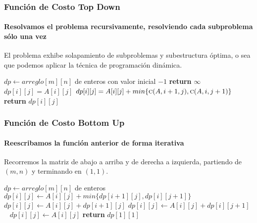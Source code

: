\documentclass[spanish]{beamer}
\begin{document}
    \begin{frame}
        \frametitle{Función de Costo Top Down}
        \framesubtitle{Resolvamos el problema recursivamente, resolviendo cada subproblema sólo una vez}

        El problema exhibe solapamiento de subproblemas y subestructura óptima, o sea que podemos aplicar la técnica de programación dinámica.

        \vspace{1em}

        \begin{algorithmic}
            \State $dp \leftarrow arreglo[m][n]$ de enteros con valor inicial $-1$
                 
                    \State \textbf{return} $\infty$
                \EndIf
                 
                     
                        \State $dp[i][j] = A[i][j]$
                    \Else {}
                        \State $dp[i][j] = A[i][j] + min\{ \textsc{c}(A, i + 1, j), \textsc{c}(A, i, j + 1) \}$
                    \EndIf
                \EndIf
                \State \textbf{return} $dp[i][j]$
            \EndProcedure
        \end{algorithmic}


    \end{frame}

    \begin{frame}
        \frametitle{Función de Costo Bottom Up}
        \framesubtitle{Reescribamos la función anterior de forma iterativa}

        Recorremos la matriz de abajo a arriba y de derecha a izquierda, partiendo de $(m,n)$ y terminando en $(1, 1)$.

        \vspace{1em}

        \small{
            \begin{algorithmic}
                    \State $dp \leftarrow arreglo[m][n]$ de enteros
                             
                                \State $dp[i][j] \leftarrow A[i][j] + min\{ dp[i+1][j], dp[i][j+1] \}$
                             
                                \State $dp[i][j] \leftarrow A[i][j] + dp[i+1][j]$
                             
                                \State $dp[i][j] \leftarrow A[i][j] + dp[i][j+1]$
                            \Else \mbox{ } $dp[i][j] \leftarrow A[i][j]$  
                            \EndIf
                        \EndFor
                    \EndFor
                    \State \textbf{return} $dp[1][1]$
                \EndProcedure
            \end{algorithmic}
        }
    \end{frame}
\end{document}

